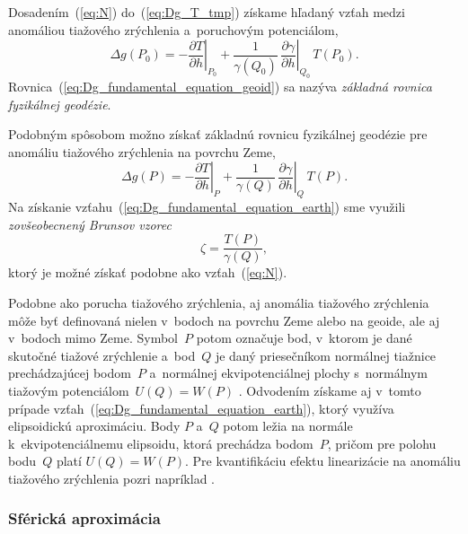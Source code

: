 \documentclass[a4paper, 12pt]{book}
\begin{document}
Dosadením~(\ref{eq:N}) do~(\ref{eq:Dg_T_tmp}) získame hľadaný vzťah medzi 
anomáliou tiažového zrýchlenia a~poruchovým potenciálom,
%
\begin{equation}
\label{eq:Dg_fundamental_equation_geoid}
\Delta g(P_0) = -\left.\frac{\partial T}{\partial h}\right|_{P_0} 
+ \frac{1}{\gamma(Q_0)} \, \left.\frac{\partial \gamma}{\partial 
h}\right|_{Q_0} \, T(P_0){.}
\end{equation}
%
Rovnica~(\ref{eq:Dg_fundamental_equation_geoid}) sa nazýva \emph{základná 
rovnica fyzikálnej geodézie}.

Podobným spôsobom možno získať základnú rovnicu fyzikálnej geodézie pre 
anomáliu tiažového zrýchlenia na povrchu Zeme,
%
\begin{equation}
\label{eq:Dg_fundamental_equation_earth}
\Delta g(P) = -\left.\frac{\partial T}{\partial h}\right|_{P} 
+ \frac{1}{\gamma(Q)} \, \left.\frac{\partial \gamma}{\partial h}\right|_{Q} \, 
T(P){.}
\end{equation}
%
Na získanie vzťahu~(\ref{eq:Dg_fundamental_equation_earth}) sme využili 
\emph{zovšeobecnený Brunsov vzorec}
%
\begin{equation}
\label{eq:zeta}
\zeta = \frac{T(P)}{\gamma(Q)}{,}
\end{equation}
%
ktorý je možné získať podobne ako vzťah~(\ref{eq:N}).

Podobne ako porucha tiažového zrýchlenia, aj anomália tiažového zrýchlenia môže 
byť definovaná nielen v~bodoch na povrchu Zeme alebo na geoide, ale aj v~bodoch 
mimo Zeme.  Symbol~$P$ potom označuje bod, v~ktorom je dané skutočné tiažové 
zrýchlenie a~bod~$Q$ je daný priesečníkom normálnej tiažnice prechádzajúcej 
bodom~$P$ a~normálnej ekvipotenciálnej plochy s~normálnym tiažovým 
potenciálom~$U(Q) = W(P)$ \parencite{MoritzPhysicalGeodesy}.  Odvodením získame 
aj v~tomto prípade vzťah~(\ref{eq:Dg_fundamental_equation_earth}), ktorý 
využíva elipsoidickú aproximáciu.  Body $P$ a~$Q$ potom ležia na normále 
k~ekvipotenciálnemu elipsoidu, ktorá prechádza bodom~$P$, pričom pre polohu 
bodu~$Q$ platí $U(Q) = W(P)$.  Pre kvantifikáciu efektu linearizácie na 
anomáliu tiažového zrýchlenia pozri napríklad \textcite{Claessens2006}.

\subsubsection{Sférická aproximácia}
\end{document}
